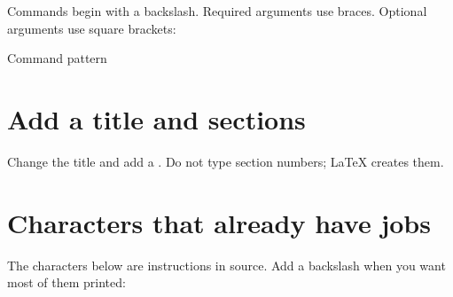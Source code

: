 Commands begin with a backslash. Required arguments use braces. Optional
arguments use square brackets:

\begin{latexcode}{Command pattern}
\end{latexcode}

\section{Add a title and sections}


Change the title and add a . Do not type section numbers;
\LaTeX{} creates them.

\section{Characters that already have jobs}

The characters below are instructions in source. Add a backslash when you want
most of them printed:

